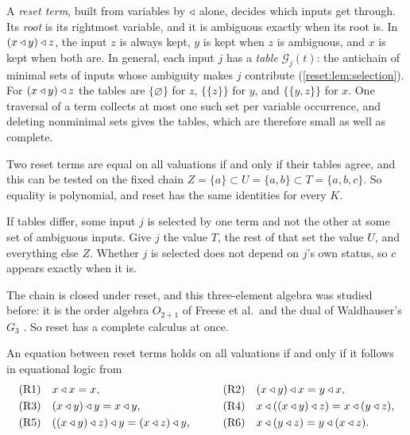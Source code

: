 A \emph{reset term}, built from variables by $\mathbin{\triangleleft}$ alone, decides which inputs get through. Its \emph{root} is its rightmost variable, and it is ambiguous exactly when its root is. In $(x\mathbin{\triangleleft} y)\mathbin{\triangleleft} z$, the input $z$ is always kept, $y$ is kept when $z$ is ambiguous, and $x$ is kept when both are. In general, each input $j$ has a \emph{table}
$\mathcal G_j(t)$: the antichain of minimal sets of inputs whose ambiguity makes $j$ contribute (\cref{reset:lem:selection}). For $(x\mathbin{\triangleleft} y)\mathbin{\triangleleft} z$ the tables are $\{\varnothing\}$ for $z$, $\{\{z\}\}$ for $y$, and $\{\{y,z\}\}$ for $x$. One traversal of a term collects at most one such set per variable occurrence, and deleting nonminimal sets gives the tables, which are therefore small as well as complete.

\begin{proposition}\label{reset:thm:three}
Two reset terms are equal on all valuations if and only if their tables agree, and this can be tested on the fixed chain
$Z=\{a\}\subset U=\{a,b\}\subset T=\{a,b,c\}$. So equality is polynomial, and reset has the same identities for every $K$.
\end{proposition}

\begin{idea}
If tables differ, some input $j$ is selected by one term and not the other at some set of ambiguous inputs. Give $j$ the value $T$, the rest of that set the value $U$, and everything else $Z$. Whether $j$ is selected does not depend on $j$'s own status, so $c$ appears exactly when it is.
\end{idea}

The chain is closed under reset, and this three-element algebra was studied before: it is the order algebra $O_{2+1}$ of Freese et al.\ and the dual of Waldhauser's $G_3$ \cite{FreeseEtAl2002,Waldhauser2006}. So reset has a complete calculus at once.

\begin{proposition}\label{reset:thm:basis}
An equation between reset terms holds on all valuations if and only if it follows in equational logic from
\begin{alignat*}{2}
 &\text{(R1)}\quad x\mathbin{\triangleleft} x=x,\qquad&&\text{(R2)}\quad (x\mathbin{\triangleleft} y)\mathbin{\triangleleft} x=y\mathbin{\triangleleft} x,\\
 &\text{(R3)}\quad (x\mathbin{\triangleleft} y)\mathbin{\triangleleft} y=x\mathbin{\triangleleft} y,\qquad&&\text{(R4)}\quad x\mathbin{\triangleleft}((x\mathbin{\triangleleft} y)\mathbin{\triangleleft} z)=x\mathbin{\triangleleft}(y\mathbin{\triangleleft} z),\\
 &\text{(R5)}\quad ((x\mathbin{\triangleleft} y)\mathbin{\triangleleft} z)\mathbin{\triangleleft} y=(x\mathbin{\triangleleft} z)\mathbin{\triangleleft} y,\qquad&&\text{(R6)}\quad x\mathbin{\triangleleft}(y\mathbin{\triangleleft} z)=y\mathbin{\triangleleft}(x\mathbin{\triangleleft} z).
\end{alignat*}
\end{proposition}

